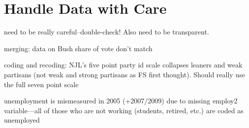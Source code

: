 

\section{Handle Data with Care}

need to be really careful--double-check!  Also need to be transparent.

merging: data on Bush share of vote don't match

coding and recoding: NJL's five point party id scale collapses leaners and weak partisans (not weak and strong partisans as FS first thought).  Should really use the full seven point scale 

unemployment is mismeasured in 2005 (+2007/2009) due to missing employ2 variable---all of those who are not working (students, retired, etc.) are coded as unemployed
